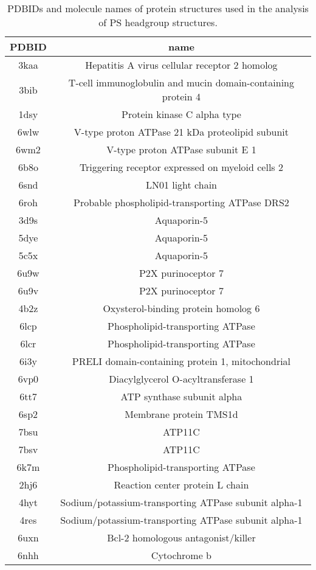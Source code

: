 \documentclass{article}
\begin{document}
\begin{table}[]
    \centering
    \begin{tabular}{c|c}
PDBID & name \\
\hline
3kaa & Hepatitis A virus cellular receptor 2 homolog \\ 
3bib & T-cell immunoglobulin and mucin domain-containing protein 4 \\ 
1dsy & Protein kinase C alpha type \\ 
6wlw & V-type proton ATPase 21 kDa proteolipid subunit \\ 
6wm2 & V-type proton ATPase subunit E 1 \\ 
6b8o & Triggering receptor expressed on myeloid cells 2 \\ 
6snd & LN01 light chain \\ 
6roh & Probable phospholipid-transporting ATPase DRS2 \\ 
3d9s & Aquaporin-5 \\ 
5dye & Aquaporin-5 \\ 
5c5x & Aquaporin-5 \\ 
6u9w & P2X purinoceptor 7 \\ 
6u9v & P2X purinoceptor 7 \\ 
4b2z & Oxysterol-binding protein homolog 6 \\ 
6lcp & Phospholipid-transporting ATPase \\ 
6lcr & Phospholipid-transporting ATPase \\ 
6i3y & PRELI domain-containing protein 1, mitochondrial \\ 
6vp0 & Diacylglycerol O-acyltransferase 1 \\ 
6tt7 & ATP synthase subunit alpha \\ 
6sp2 & Membrane protein TMS1d \\ 
7bsu & ATP11C \\ 
7bsv & ATP11C \\ 
6k7m & Phospholipid-transporting ATPase \\ 
2hj6 & Reaction center protein L chain \\ 
4hyt & Sodium/potassium-transporting ATPase subunit alpha-1 \\ 
4res & Sodium/potassium-transporting ATPase subunit alpha-1 \\ 
6uxn & Bcl-2 homologous antagonist/killer \\ 
6nhh & Cytochrome b \\ 
    \end{tabular}
    \caption{PDBIDs and molecule names of protein structures used in the analysis of PS headgroup structures.}
    \label{tab:my_label}
\end{table}
\end{document}
